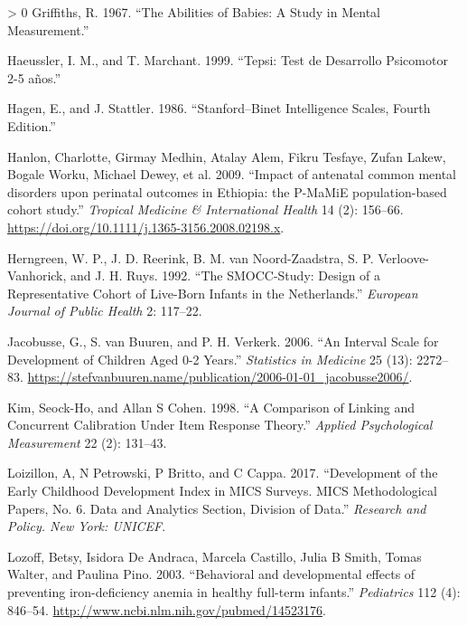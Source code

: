 \documentclass[
]{book}
\newlength{\cslhangindent}
\newenvironment{CSLReferences}[3] %
 {%
  \setlength{\parindent}{0pt}
  \ifodd #1 \everypar{\setlength{\hangindent}{\cslhangindent}}\ignorespaces\fi
  \ifnum #2 > 0
  \setlength{\parskip}{#2\baselineskip}
  \fi
 }%
 {}
\begin{document}
\begin{CSLReferences}{1}{0}
\leavevmode\hypertarget{ref-griffiths1967}{}%
Griffiths, R. 1967. {``The Abilities of Babies: A Study in Mental Measurement.''}

\leavevmode\hypertarget{ref-haeussler1999}{}%
Haeussler, I. M., and T. Marchant. 1999. {``Tepsi: Test de Desarrollo Psicomotor 2-5 años.''}

\leavevmode\hypertarget{ref-hagen1986}{}%
Hagen, E., and J. Stattler. 1986. {``Stanford--Binet Intelligence Scales, Fourth Edition.''}

\leavevmode\hypertarget{ref-Hanlon2009}{}%
Hanlon, Charlotte, Girmay Medhin, Atalay Alem, Fikru Tesfaye, Zufan Lakew, Bogale Worku, Michael Dewey, et al. 2009. {``{Impact of antenatal common mental disorders upon perinatal outcomes in Ethiopia: the P-MaMiE population-based cohort study}.''} \emph{Tropical Medicine {\&} International Health} 14 (2): 156--66. \url{https://doi.org/10.1111/j.1365-3156.2008.02198.x}.

\leavevmode\hypertarget{ref-herngreen1992}{}%
Herngreen, W. P., J. D. Reerink, B. M. van Noord-Zaadstra, S. P. Verloove-Vanhorick, and J. H. Ruys. 1992. {``The SMOCC-Study: Design of a Representative Cohort of Live-Born Infants in the Netherlands.''} \emph{European Journal of Public Health} 2: 117--22.

\leavevmode\hypertarget{ref-jacobusse2006}{}%
Jacobusse, G., S. van Buuren, and P. H. Verkerk. 2006. {``An Interval Scale for Development of Children Aged 0-2 Years.''} \emph{Statistics in Medicine} 25 (13): 2272--83. \url{https://stefvanbuuren.name/publication/2006-01-01_jacobusse2006/}.

\leavevmode\hypertarget{ref-kim1998}{}%
Kim, Seock-Ho, and Allan S Cohen. 1998. {``A Comparison of Linking and Concurrent Calibration Under Item Response Theory.''} \emph{Applied Psychological Measurement} 22 (2): 131--43.

\leavevmode\hypertarget{ref-loizillon2017}{}%
Loizillon, A, N Petrowski, P Britto, and C Cappa. 2017. {``Development of the Early Childhood Development Index in MICS Surveys. MICS Methodological Papers, No. 6. Data and Analytics Section, Division of Data.''} \emph{Research and Policy. New York: UNICEF}.

\leavevmode\hypertarget{ref-Lozoff2003}{}%
Lozoff, Betsy, Isidora De Andraca, Marcela Castillo, Julia B Smith, Tomas Walter, and Paulina Pino. 2003. {``{Behavioral and developmental effects of preventing iron-deficiency anemia in healthy full-term infants.}''} \emph{Pediatrics} 112 (4): 846--54. \url{http://www.ncbi.nlm.nih.gov/pubmed/14523176}.


\end{CSLReferences}
\end{document}
